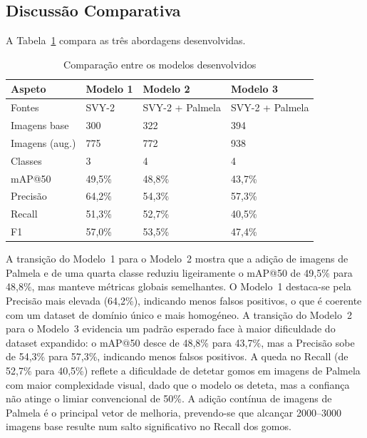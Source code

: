 \documentclass[12pt, a4paper]{article}
\begin{document}
\subsection{Discussão Comparativa}

A Tabela~\ref{tab:comparacao} compara as três abordagens desenvolvidas.

\begin{table}[H]
  \centering
  \caption{Comparação entre os modelos desenvolvidos}
  \label{tab:comparacao}
  \begin{tabularx}{\columnwidth}{l X X X}
    \toprule
    \textbf{Aspeto}        & \textbf{Modelo 1} & \textbf{Modelo 2} & \textbf{Modelo 3} \\
    \midrule
    Fontes                 & SVY-2             & SVY-2 + Palmela   & SVY-2 + Palmela \\
    Imagens base           & 300               & 322               & 394 \\
    Imagens (aug.)         & 775               & 772               & 938 \\
    Classes                & 3                 & 4                 & 4 \\
    mAP@50                 & 49,5\%            & 48,8\%            & 43,7\% \\
    Precisão               & 64,2\%            & 54,3\%            & 57,3\% \\
    Recall                 & 51,3\%            & 52,7\%            & 40,5\% \\
    F1                     & 57,0\%            & 53,5\%            & 47,4\% \\
    \bottomrule
  \end{tabularx}
\end{table}

A transição do Modelo~1 para o Modelo~2 mostra que a adição de imagens de
Palmela e de uma quarta classe reduziu ligeiramente o mAP@50 de 49,5\% para
48,8\%, mas manteve métricas globais semelhantes. O Modelo~1 destaca-se pela
Precisão mais elevada (64,2\%), indicando menos falsos positivos, o que é
coerente com um dataset de domínio único e mais homogéneo.
A transição do Modelo~2 para o Modelo~3 evidencia um padrão esperado face
à maior dificuldade do dataset expandido: o mAP@50 desce de 48,8\% para
43,7\%, mas a Precisão sobe de 54,3\% para 57,3\%, indicando menos falsos
positivos. A queda no Recall (de 52,7\% para 40,5\%) reflete a dificuldade
de detetar gomos em imagens de Palmela com maior complexidade visual,
dado que o modelo os deteta, mas a confiança não atinge o limiar convencional de
50\%. A adição contínua de imagens de Palmela é o principal vetor de
melhoria, prevendo-se que alcançar 2000--3000 imagens base resulte num
salto significativo no Recall dos gomos.
\end{document}
